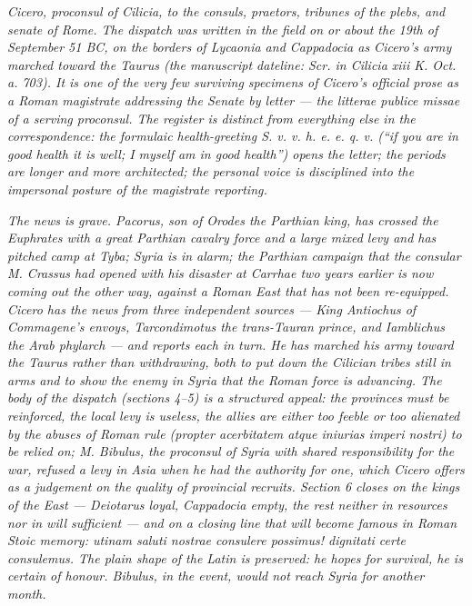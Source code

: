 
\textit{Cicero, proconsul of Cilicia, to the consuls,
praetors, tribunes of the plebs, and senate of Rome.
The dispatch was written in the field on or about the
19th of September 51 BC, on the borders of Lycaonia and
Cappadocia as Cicero's army marched toward the Taurus
(the manuscript dateline: \textit{Scr. in Cilicia xiii
K. Oct. a. 703}). It is one of the very few surviving
specimens of Cicero's official prose as a Roman
magistrate addressing the Senate by letter --- the
\textit{litterae publice missae} of a serving
proconsul. The register is distinct from everything
else in the correspondence: the formulaic
health-greeting \textit{S. v. v. h. e. e. q. v.}
(``if you are in good health it is well; I myself am
in good health'') opens the letter; the periods are
longer and more architected; the personal voice is
disciplined into the impersonal posture of the
magistrate reporting.}

\textit{The news is grave. Pacorus, son of Orodes the
Parthian king, has crossed the Euphrates with a great
Parthian cavalry force and a large mixed levy and has
pitched camp at Tyba; Syria is in alarm; the Parthian
campaign that the consular M. Crassus had opened with
his disaster at Carrhae two years earlier is now coming
out the other way, against a Roman East that has not
been re-equipped. Cicero has the news from three
independent sources --- King Antiochus of Commagene's
envoys, Tarcondimotus the trans-Tauran prince, and
Iamblichus the Arab phylarch --- and reports each in
turn. He has marched his army toward the Taurus rather
than withdrawing, both to put down the Cilician tribes
still in arms and to show the enemy in Syria that the
Roman force is advancing. The body of the dispatch
(sections 4--5) is a structured appeal: the provinces
must be reinforced, the local levy is useless, the
allies are either too feeble or too alienated by the
abuses of Roman rule (\textit{propter acerbitatem
atque iniurias imperi nostri}) to be relied on; M.
Bibulus, the proconsul of Syria with shared
responsibility for the war, refused a levy in Asia
when he had the authority for one, which Cicero offers
as a judgement on the quality of provincial recruits.
Section 6 closes on the kings of the East --- Deiotarus
loyal, Cappadocia empty, the rest neither in resources
nor in will sufficient --- and on a closing line that
will become famous in Roman Stoic memory:
\textit{utinam saluti nostrae consulere possimus!
dignitati certe consulemus}. The plain shape of the
Latin is preserved: he hopes for survival, he is
certain of honour. Bibulus, in the event, would not
reach Syria for another month.}

